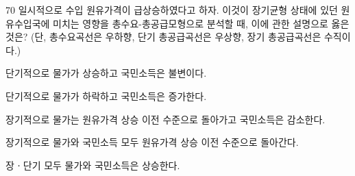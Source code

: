 \begin{question}{70}
일시적으로 수입 원유가격이 급상승하였다고 하자. 이것이 장기균형 상태에 있던 원유수입국에 미치는 영향을 총수요-총공급모형으로 분석할 때, 이에 관한 설명으로 옳은 것은? (단, 총수요곡선은 우하향, 단기 총공급곡선은 우상향, 장기 총공급곡선은 수직이다.)
\begin{choices}
  \item 단기적으로 물가가 상승하고 국민소득은 불변이다.
  \item 단기적으로 물가가 하락하고 국민소득은 증가한다.
  \item 장기적으로 물가는 원유가격 상승 이전 수준으로 돌아가고 국민소득은 감소한다.
  \item 장기적으로 물가와 국민소득 모두 원유가격 상승 이전 수준으로 돌아간다.
  \item 장ㆍ단기 모두 물가와 국민소득은 상승한다.
\end{choices}
\end{question}
